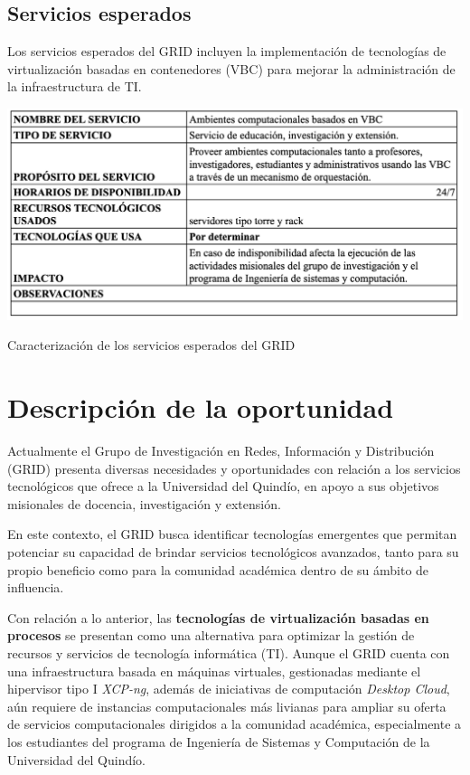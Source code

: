 \subsection{Servicios esperados}
Los servicios esperados del GRID incluyen la implementación de tecnologías de virtualización basadas en contenedores (VBC) para mejorar la administración de la infraestructura de TI.\@

\begin{table}[H]
    \centering
    \includegraphics[width=\textwidth] {tablas-images/cp1/servicios-esperados/servicios-esperados.png}
    \caption{Caracterización de los servicios esperados del GRID}\label{tab:servicios-esperados}
\end{table}

\section{Descripción de la oportunidad}

Actualmente el Grupo de Investigación en Redes, Información y Distribución (GRID) presenta diversas necesidades y oportunidades con relación a los servicios tecnológicos que ofrece a la Universidad del Quindío, en apoyo a sus objetivos misionales de docencia, investigación y extensión.

En este contexto, el GRID busca identificar tecnologías emergentes que permitan potenciar su capacidad de brindar servicios tecnológicos avanzados, tanto para su propio beneficio como para la comunidad académica dentro de su ámbito de influencia.

Con relación a lo anterior, las \textbf{tecnologías de virtualización basadas en procesos} se presentan como una alternativa para optimizar la gestión de recursos y servicios de tecnología informática (TI). Aunque el GRID cuenta con una infraestructura basada en máquinas virtuales, gestionadas mediante el hipervisor tipo I \textit{XCP-ng}, además de iniciativas de computación \textit{Desktop Cloud}, aún requiere de instancias computacionales más livianas para ampliar su oferta de servicios computacionales dirigidos a la comunidad académica, especialmente a los estudiantes del programa de Ingeniería de Sistemas y Computación de la Universidad del Quindío.

